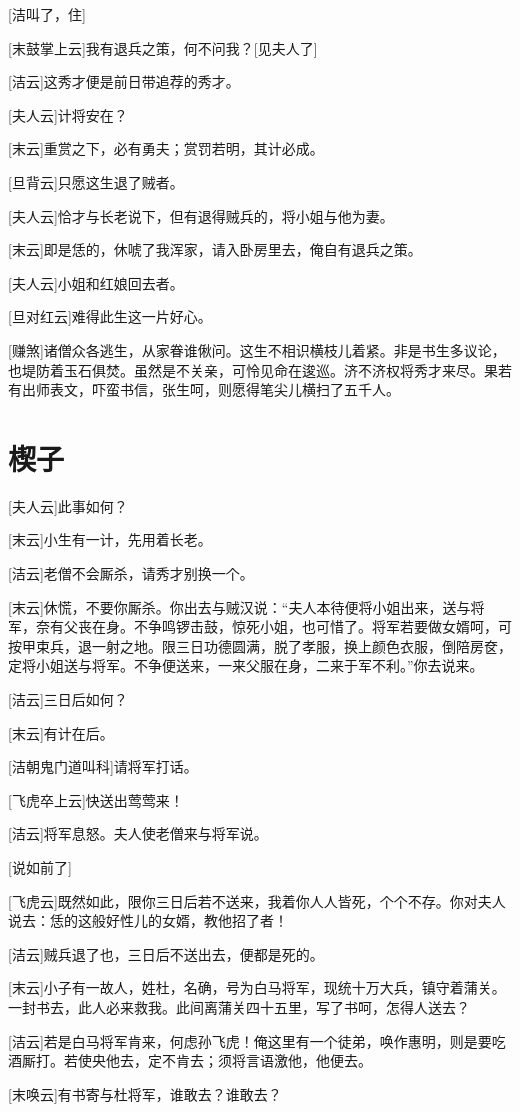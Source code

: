 \documentclass{book}
\newcommand\nchapter[1]{\chapter*{#1}\markboth{#1}{}\addcontentsline{toc}{chapter}{#1}}
\begin{document}
[洁叫了，住]

[末鼓掌上云]我有退兵之策，何不问我？[见夫人了]

[洁云]这秀才便是前日带追荐的秀才。

[夫人云]计将安在？

[末云]重赏之下，必有勇夫；赏罚若明，其计必成。

[旦背云]只愿这生退了贼者。

[夫人云]恰才与长老说下，但有退得贼兵的，将小姐与他为妻。

[末云]即是恁的，休唬了我浑家，请入卧房里去，俺自有退兵之策。

[夫人云]小姐和红娘回去者。

[旦对红云]难得此生这一片好心。

[赚煞]诸僧众各逃生，从家眷谁偢问。这生不相识横枝儿着紧。非是书生多议论，也堤防着玉石俱焚。虽然是不关亲，可怜见命在逡巡。济不济权将秀才来尽。果若有出师表文，吓蛮书信，张生呵，则愿得笔尖儿横扫了五千人。

\nchapter{楔子}

[夫人云]此事如何？

[末云]小生有一计，先用着长老。

[洁云]老僧不会厮杀，请秀才别换一个。

[末云]休慌，不要你厮杀。你出去与贼汉说：``夫人本待便将小姐出来，送与将军，奈有父丧在身。不争鸣锣击鼓，惊死小姐，也可惜了。将军若要做女婿呵，可按甲束兵，退一射之地。限三日功德圆满，脱了孝服，换上颜色衣服，倒陪房奁，定将小姐送与将军。不争便送来，一来父服在身，二来于军不利。''你去说来。

[洁云]三日后如何？

[末云]有计在后。

[洁朝鬼门道叫科]请将军打话。

[飞虎卒上云]快送出莺莺来！

[洁云]将军息怒。夫人使老僧来与将军说。

[说如前了]

[飞虎云]既然如此，限你三日后若不送来，我着你人人皆死，个个不存。你对夫人说去：恁的这般好性儿的女婿，教他招了者！

[洁云]贼兵退了也，三日后不送出去，便都是死的。

[末云]小子有一故人，姓杜，名确，号为白马将军，现统十万大兵，镇守着蒲关。一封书去，此人必来救我。此间离蒲关四十五里，写了书呵，怎得人送去？

[洁云]若是白马将军肯来，何虑孙飞虎！俺这里有一个徒弟，唤作惠明，则是要吃酒厮打。若使央他去，定不肯去；须将言语激他，他便去。

[末唤云]有书寄与杜将军，谁敢去？谁敢去？
\end{document}
